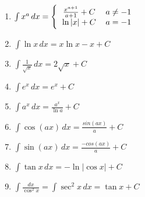 \begin{center}
    \begin{small}
        \begin{enumerate}
            \item \begin{math}
                \int x^a\,dx =
                \Bigg\{\begin{tabular}{ccc}
                    $\frac{x^{a+1}}{a+1} + C$  & $a \neq -1$ & \\
                    $ \ln{\left|x\right|} + C$ & $a = -1$ & \\
                  \end{tabular}
            \end{math}
            \item \begin{math}
                \int \ln {x}\,dx = x \ln {x} - x + C
            \end{math}
            \item \begin{math}
                \int \frac {1}{\sqrt{x}}\,dx=2\sqrt{x} + C 
            \end{math}
            \item \begin{math}
                \int e^x\,dx = e^x + C
            \end{math}
            \item \begin{math}
                \int a^x\,dx = \frac{a^x}{\ln{a}} + C
            \end{math}
            \item \begin{math}
                \int \cos({ax}) \, dx = { \frac{sin (ax)}{a} } + C
            \end{math}
            \item \begin{math}
                \int \sin({ax}) \, dx = { \frac{-cos(ax)}{a} } + C
            \end{math}
            \item \begin{math}
                \int \tan{x} \, dx = -\ln{\left| \cos {x} \right|} + C
            \end{math}
            \item \begin{math}
                \int \frac{dx}{\cos^2 x}=\int \sec^2 x \, dx = \tan x + C
            \end{math}

\end{enumerate}
\end{small}
\end{center}
